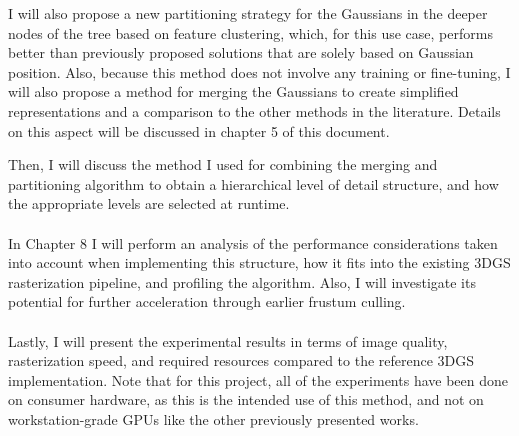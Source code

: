 I will also propose a new partitioning strategy for the Gaussians in the deeper nodes of the tree based on feature clustering, which, for this use case, performs better than previously proposed solutions that are solely based on Gaussian position. Also, because this method does not involve any training or fine-tuning, I will also propose a method for merging the Gaussians to create simplified representations and a comparison to the other methods in the literature. Details on this aspect will be discussed in chapter 5 of this document.

Then, I will discuss the method I used for combining the merging and partitioning algorithm to obtain a hierarchical level of detail structure, and how the appropriate levels are selected at runtime.

\paragraph{}
In Chapter 8 I will perform an analysis of the performance considerations taken into account when implementing this structure, how it fits into the existing 3DGS rasterization pipeline, and profiling the algorithm. Also, I will investigate its potential for further acceleration through earlier frustum culling. 

\paragraph{}
Lastly, I will present the experimental results in terms of image quality, rasterization speed, and required resources compared to the reference 3DGS implementation. Note that for this project, all of the experiments have been done on consumer hardware, as this is the intended use of this method, and not on workstation-grade GPUs like the other previously presented works. 
